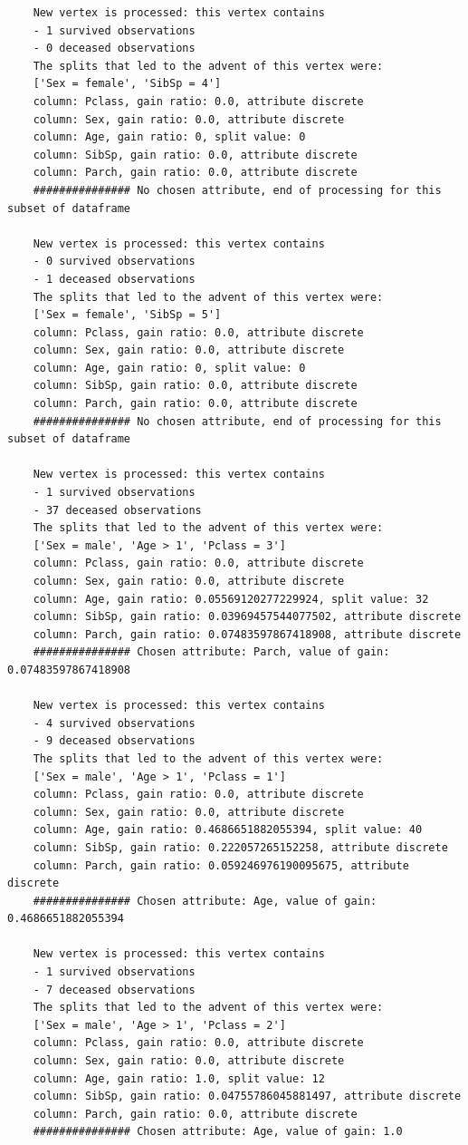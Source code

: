 \documentclass[12pt]{article}
\begin{document}
\begin{verbatim}
	New vertex is processed: this vertex contains
	- 1 survived observations
	- 0 deceased observations
	The splits that led to the advent of this vertex were:
	['Sex = female', 'SibSp = 4']
	column: Pclass, gain ratio: 0.0, attribute discrete
	column: Sex, gain ratio: 0.0, attribute discrete
	column: Age, gain ratio: 0, split value: 0
	column: SibSp, gain ratio: 0.0, attribute discrete
	column: Parch, gain ratio: 0.0, attribute discrete
	############### No chosen attribute, end of processing for this subset of dataframe
	
	New vertex is processed: this vertex contains
	- 0 survived observations
	- 1 deceased observations
	The splits that led to the advent of this vertex were:
	['Sex = female', 'SibSp = 5']
	column: Pclass, gain ratio: 0.0, attribute discrete
	column: Sex, gain ratio: 0.0, attribute discrete
	column: Age, gain ratio: 0, split value: 0
	column: SibSp, gain ratio: 0.0, attribute discrete
	column: Parch, gain ratio: 0.0, attribute discrete
	############### No chosen attribute, end of processing for this subset of dataframe
	
	New vertex is processed: this vertex contains
	- 1 survived observations
	- 37 deceased observations
	The splits that led to the advent of this vertex were:
	['Sex = male', 'Age > 1', 'Pclass = 3']
	column: Pclass, gain ratio: 0.0, attribute discrete
	column: Sex, gain ratio: 0.0, attribute discrete
	column: Age, gain ratio: 0.05569120277229924, split value: 32
	column: SibSp, gain ratio: 0.03969457544077502, attribute discrete
	column: Parch, gain ratio: 0.07483597867418908, attribute discrete
	############### Chosen attribute: Parch, value of gain: 0.07483597867418908
	
	New vertex is processed: this vertex contains
	- 4 survived observations
	- 9 deceased observations
	The splits that led to the advent of this vertex were:
	['Sex = male', 'Age > 1', 'Pclass = 1']
	column: Pclass, gain ratio: 0.0, attribute discrete
	column: Sex, gain ratio: 0.0, attribute discrete
	column: Age, gain ratio: 0.4686651882055394, split value: 40
	column: SibSp, gain ratio: 0.222057265152258, attribute discrete
	column: Parch, gain ratio: 0.059246976190095675, attribute discrete
	############### Chosen attribute: Age, value of gain: 0.4686651882055394
	
	New vertex is processed: this vertex contains
	- 1 survived observations
	- 7 deceased observations
	The splits that led to the advent of this vertex were:
	['Sex = male', 'Age > 1', 'Pclass = 2']
	column: Pclass, gain ratio: 0.0, attribute discrete
	column: Sex, gain ratio: 0.0, attribute discrete
	column: Age, gain ratio: 1.0, split value: 12
	column: SibSp, gain ratio: 0.04755786045881497, attribute discrete
	column: Parch, gain ratio: 0.0, attribute discrete
	############### Chosen attribute: Age, value of gain: 1.0
	

\end{verbatim}
\end{document}

